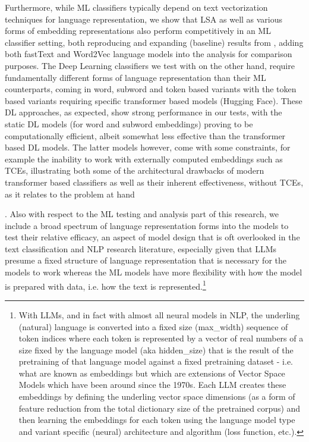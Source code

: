 \documentclass[final]{clv2025-revised}
\begin{document}
Furthermore, while ML classifiers typically depend on text vectorization techniques for language representation, we show that LSA as well as various forms of embedding representations also perform competitively in an ML classifier setting, both reproducing and expanding (baseline) results from \cite{moreo2021}, adding both fastText and Word2Vec language models into the analysis for comparison purposes. The Deep Learning classifiers we test with on the other hand, require fundamentally different forms of language representation than their ML counterparts, coming in word, subword and token based variants with the token based variants requiring specific transformer based models (Hugging Face). These DL approaches, as expected, show strong performance in our tests, with the static DL models (for word and subword embeddings) proving to be computationally efficient, albeit somewhat less effective than the transformer based DL models. The latter models however, come with some constraints, for example the inability to work with externally computed embeddings such as TCEs, illustrating both some of the architectural drawbacks of modern transformer based classifiers as well as their inherent effectiveness, without TCEs, as it relates to the problem at hand

. Also with respect to the ML testing and analysis part of this research, we include a broad spectrum of language representation forms into the models to test their relative efficacy, an aspect of model design that is oft overlooked in the text classification and NLP research literature, especially given that LLMs presume a fixed structure of language representation that is necessary for the models to work whereas the ML models have more flexibility with how the model is prepared with data, i.e. how the text is represented.\footnote{With LLMs, and in fact with almost all neural models in NLP, the underling (natural) language is converted into a fixed size (max\_width) sequence of token indices where each token is represented by a vector of real numbers of a size fixed by the language model (aka hidden\_size) that is the result of the pretraining of that language model against a fixed pretraining dataset - i.e. what are known as embeddings but which are extensions of Vector Space Models which have been around since the 1970s. Each LLM creates these embeddings by defining the underling vector space dimensions (as a form of feature reduction from the total dictionary size of the pretrained corpus) and then learning the embeddings for each token using the language model type and variant specific (neural) architecture and algorithm (loss function, etc.).} 
\end{document}
